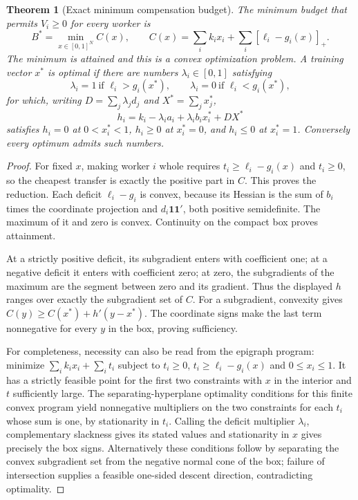 \documentclass[11pt]{article}
\newtheorem{theorem}{Theorem}
\theoremstyle{remark}\newtheorem{remark}[theorem]{Remark}
\begin{document}
\begin{theorem}[Exact minimum compensation budget]
The minimum budget that permits $V_i\ge0$ for every worker is
\[
 B^*=\min_{x\in[0,1]^N} C(x),\qquad
 C(x)=\sum_i k_ix_i+\sum_i[\ell_i-g_i(x)]_+.
\]
The minimum is attained and this is a convex optimization problem. A training vector $x^*$ is optimal if there are numbers $\lambda_i\in[0,1]$ satisfying
\[
 \lambda_i=1\ \text{if }\ell_i>g_i(x^*),\qquad
 \lambda_i=0\ \text{if }\ell_i<g_i(x^*),
\]
for which, writing $D=\sum_j\lambda_j d_j$ and $X^*=\sum_jx_j^*$,
\[
 h_i=k_i-\lambda_i a_i+\lambda_i b_i x_i^*+DX^*
\]
satisfies $h_i=0$ at $0<x_i^*<1$, $h_i\ge0$ at $x_i^*=0$, and $h_i\le0$ at $x_i^*=1$. Conversely every optimum admits such numbers.
\end{theorem}
\begin{proof}
For fixed $x$, making worker $i$ whole requires $t_i\ge\ell_i-g_i(x)$ and $t_i\ge0$, so the cheapest transfer is exactly the positive part in $C$. This proves the reduction. Each deficit $\ell_i-g_i$ is convex, because its Hessian is the sum of $b_i$ times the coordinate projection and $d_i\mathbf1\mathbf1'$, both positive semidefinite. The maximum of it and zero is convex. Continuity on the compact box proves attainment.

At a strictly positive deficit, its subgradient enters with coefficient one; at a negative deficit it enters with coefficient zero; at zero, the subgradients of the maximum are the segment between zero and its gradient. Thus the displayed $h$ ranges over exactly the subgradient set of $C$. For a subgradient, convexity gives $C(y)\ge C(x^*)+h'(y-x^*)$. The coordinate signs make the last term nonnegative for every $y$ in the box, proving sufficiency.

For completeness, necessity can also be read from the epigraph program: minimize $\sum_i k_ix_i+\sum_i t_i$ subject to $t_i\ge0$, $t_i\ge\ell_i-g_i(x)$ and $0\le x_i\le1$. It has a strictly feasible point for the first two constraints with $x$ in the interior and $t$ sufficiently large. The separating-hyperplane optimality conditions for this finite convex program yield nonnegative multipliers on the two constraints for each $t_i$ whose sum is one, by stationarity in $t_i$. Calling the deficit multiplier $\lambda_i$, complementary slackness gives its stated values and stationarity in $x$ gives precisely the box signs. Alternatively these conditions follow by separating the convex subgradient set from the negative normal cone of the box; failure of intersection supplies a feasible one-sided descent direction, contradicting optimality.
\end{proof}
\end{document}

